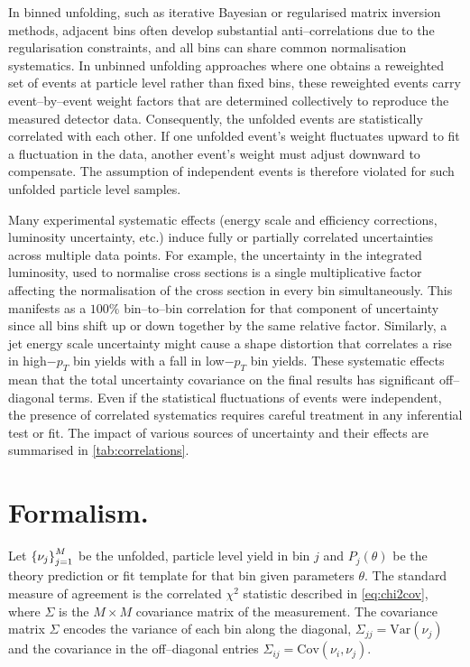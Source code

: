     In binned unfolding, such as iterative Bayesian or regularised matrix inversion methods, adjacent bins often develop substantial anti--correlations due to the regularisation constraints, and all bins can share common normalisation systematics.
    In unbinned unfolding approaches where one obtains a reweighted set of events at particle level rather than fixed bins, these reweighted events carry event--by--event weight factors that are determined collectively to reproduce the measured detector data.
    Consequently, the unfolded events are statistically correlated with each other.
    If one unfolded event’s weight fluctuates upward to fit a fluctuation in the data, another event’s weight must adjust downward to compensate.
    The assumption of independent events is therefore violated for such unfolded particle level samples.

    Many experimental systematic effects (energy scale and efficiency corrections, luminosity uncertainty, etc.) induce fully or partially correlated uncertainties across multiple data points.
    For example, the uncertainty in the integrated luminosity, used to normalise cross sections is a single multiplicative factor affecting the normalisation of the cross section in every bin simultaneously.
    This manifests as a $100\%$ bin--to--bin correlation for that component of uncertainty since all bins shift up or down together by the same relative factor.
    Similarly, a jet energy scale uncertainty might cause a shape distortion that correlates a rise in high$-p_T$ bin yields with a fall in low$-p_T$ bin yields.
    These systematic effects mean that the total uncertainty covariance on the final results has significant off--diagonal terms.
    Even if the statistical fluctuations of events were independent, the presence of correlated systematics requires careful treatment in any inferential test or fit.
    The impact of various sources of uncertainty and their effects are summarised in \cref{tab:correlations}.


\section{Formalism.}
\label{sec:formalism}
    Let $\qty{\nu_j}_{j=1}^M$ be the unfolded, particle level yield in bin $j$ and $P_j(\theta)$ be the theory prediction or fit template for that bin given parameters $\theta$.
    The standard measure of agreement is the correlated $\chi^2$ statistic described in \cref{eq:chi2cov},
    where $\Sigma$ is the $M\times M$ covariance matrix of the measurement.
    The covariance matrix $\Sigma$ encodes the variance of each bin along the diagonal, $\Sigma_{jj} = \mathrm{Var}(\nu_j)$ and the covariance in the off--diagonal entries $\Sigma_{ij} = \mathrm{Cov}(\nu_i, \nu_j)$.
    
